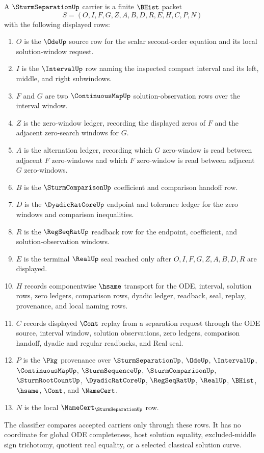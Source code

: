 \begin{definition}
\label{def:sturm-separation-carrier}
A $\SturmSeparationUp$ carrier is a finite $\BHist$ packet
$$
S=(O,I,F,G,Z,A,B,D,R,E,H,C,P,N)
$$
with the following displayed rows:
\begin{enumerate}
\item $O$ is the $\OdeUp$ source row for the scalar second-order equation and its local solution-window request.
\item $I$ is the $\IntervalUp$ row naming the inspected compact interval and its left, middle, and right subwindows.
\item $F$ and $G$ are two $\ContinuousMapUp$ solution-observation rows over the interval window.
\item $Z$ is the zero-window ledger, recording the displayed zeros of $F$ and the adjacent zero-search windows for $G$.
\item $A$ is the alternation ledger, recording which $G$ zero-window is read between adjacent $F$ zero-windows and which $F$ zero-window is read between adjacent $G$ zero-windows.
\item $B$ is the $\SturmComparisonUp$ coefficient and comparison handoff row.
\item $D$ is the $\DyadicRatCoreUp$ endpoint and tolerance ledger for the zero windows and comparison inequalities.
\item $R$ is the $\RegSeqRatUp$ readback row for the endpoint, coefficient, and solution-observation windows.
\item $E$ is the terminal $\RealUp$ seal reached only after $O,I,F,G,Z,A,B,D,R$ are displayed.
\item $H$ records componentwise $\hsame$ transport for the ODE, interval, solution rows, zero ledgers, comparison rows, dyadic ledger, readback, seal, replay, provenance, and local naming rows.
\item $C$ records displayed $\Cont$ replay from a separation request through the ODE source, interval window, solution observations, zero ledgers, comparison handoff, dyadic and regular readbacks, and Real seal.
\item $P$ is the $\Pkg$ provenance over $\SturmSeparationUp$, $\OdeUp$, $\IntervalUp$, $\ContinuousMapUp$, $\SturmSequenceUp$, $\SturmComparisonUp$, $\SturmRootCountUp$, $\DyadicRatCoreUp$, $\RegSeqRatUp$, $\RealUp$, $\BHist$, $\hsame$, $\Cont$, and $\NameCert$.
\item $N$ is the local $\NameCert_{\SturmSeparationUp}$ row.
\end{enumerate}
The classifier compares accepted carriers only through these rows. It has no coordinate for global ODE completeness, host solution equality, excluded-middle sign trichotomy, quotient real equality, or a selected classical solution curve.
\end{definition}

